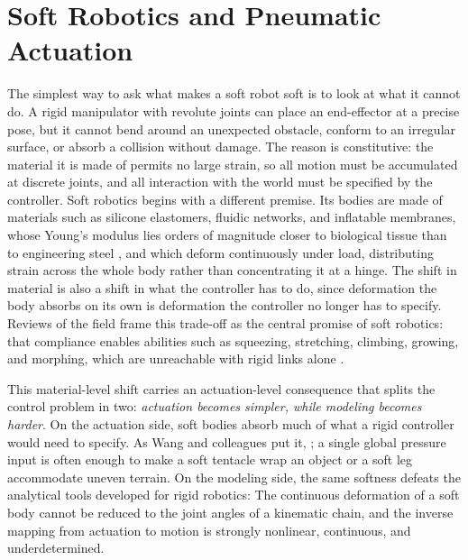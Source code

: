 \section{Soft Robotics and Pneumatic Actuation}
\label{sec:soft-robotics}

The simplest way to ask what makes a soft robot soft is to look at what it cannot do. A rigid manipulator with revolute joints can place an end-effector at a precise pose, but it cannot bend around an unexpected obstacle, conform to an irregular surface, or absorb a collision without damage. The reason is constitutive: the material it is made of permits no large strain, so all motion must be accumulated at discrete joints, and all interaction with the world must be specified by the controller. Soft robotics begins with a different premise. Its bodies are made of materials such as silicone elastomers, fluidic networks, and inflatable membranes, whose Young's modulus lies orders of magnitude closer to biological tissue than to engineering steel \cite{rusDesignFabricationControl2015}, and which deform continuously under load, distributing strain across the whole body rather than concentrating it at a hinge. The shift in material is also a shift in what the controller has to do, since deformation the body absorbs on its own is deformation the controller no longer has to specify. Reviews of the field frame this trade-off as the central promise of soft robotics: that compliance enables abilities such as squeezing, stretching, climbing, growing, and morphing, which are unreachable with rigid links alone \cite{laschi_soft_2016,rusDesignFabricationControl2015}.

This material-level shift carries an actuation-level consequence that splits the control problem in two: \textit{actuation becomes simpler, while modeling becomes harder}. On the actuation side, soft bodies absorb much of what a rigid controller would need to specify. As Wang and colleagues put it, \cite{wangEmbodyingPhysicalComputing2026}; a single global pressure input is often enough to make a soft tentacle wrap an object or a soft leg accommodate uneven terrain. On the modeling side, the same softness defeats the analytical tools developed for rigid robotics: \cite{rusDesignFabricationControl2015} The continuous deformation of a soft body cannot be reduced to the joint angles of a kinematic chain, and the inverse mapping from actuation to motion is strongly nonlinear, continuous, and underdetermined.

